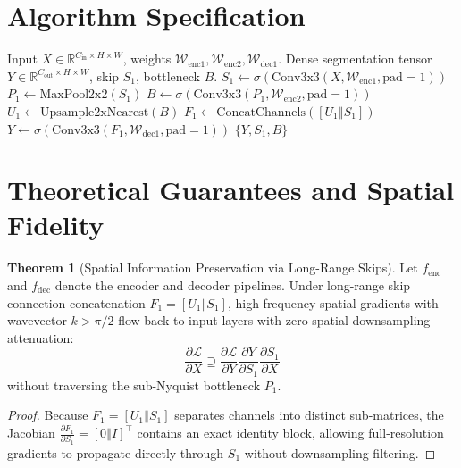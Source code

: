\documentclass[11pt,a4paper]{article}
\theoremstyle{definition}
\newtheorem{theorem}{Theorem}[section]
\begin{document}
\section{Algorithm Specification}

\begin{algorithm}[H]
\caption{U-Net Encoder-Decoder Forward Pass}
\label{alg:unet}
\begin{algorithmic}[1]
\Require Input $X \in \mathbb{R}^{C_{\text{in}} \times H \times W}$, weights $\mathcal{W}_{\text{enc1}}, \mathcal{W}_{\text{enc2}}, \mathcal{W}_{\text{dec1}}$.
\Ensure Dense segmentation tensor $Y \in \mathbb{R}^{C_{\text{out}} \times H \times W}$, skip $S_1$, bottleneck $B$.
\State $S_1 \gets \sigma(\text{Conv3x3}(X, \mathcal{W}_{\text{enc1}}, \text{pad}=1))$
\State $P_1 \gets \text{MaxPool2x2}(S_1)$
\State $B \gets \sigma(\text{Conv3x3}(P_1, \mathcal{W}_{\text{enc2}}, \text{pad}=1))$
\State $U_1 \gets \text{Upsample2xNearest}(B)$
\State $F_1 \gets \text{ConcatChannels}([U_1 \mathbin{\Vert} S_1])$
\State $Y \gets \sigma(\text{Conv3x3}(F_1, \mathcal{W}_{\text{dec1}}, \text{pad}=1))$
\State \Return $\{Y, S_1, B\}$
\end{algorithmic}
\end{algorithm}

\section{Theoretical Guarantees and Spatial Fidelity}

\begin{theorem}[Spatial Information Preservation via Long-Range Skips]
Let $f_{\text{enc}}$ and $f_{\text{dec}}$ denote the encoder and decoder pipelines. Under long-range skip connection concatenation $F_1 = [U_1 \mathbin{\Vert} S_1]$, high-frequency spatial gradients with wavevector $k > \pi / 2$ flow back to input layers with zero spatial downsampling attenuation:
\begin{equation}
\frac{\partial \mathcal{L}}{\partial X} \supseteq \frac{\partial \mathcal{L}}{\partial Y} \frac{\partial Y}{\partial S_1} \frac{\partial S_1}{\partial X}
\end{equation}
without traversing the sub-Nyquist bottleneck $P_1$.
\end{theorem}

\begin{proof}
Because $F_1 = [U_1 \mathbin{\Vert} S_1]$ separates channels into distinct sub-matrices, the Jacobian $\frac{\partial F_1}{\partial S_1} = [0 \mathbin{\Vert} I]^\top$ contains an exact identity block, allowing full-resolution gradients to propagate directly through $S_1$ without downsampling filtering.
\end{proof}
\end{document}
